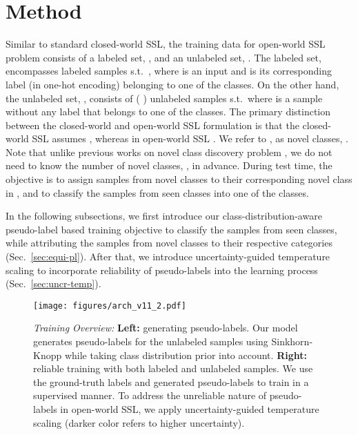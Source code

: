 \documentclass[runningheads]{eccv2022submission}
\begin{document}
  
\vspace{-2mm}
\section{Method}
\vspace{-2mm}

Similar to standard closed-world SSL, the training data for open-world SSL problem consists of a labeled set, , and an unlabeled set, . The labeled set,  encompasses  labeled samples s.t.\ , where  is an input and  is its corresponding label (in one-hot encoding) belonging to one of the  classes. On the other hand, the unlabeled set, , consists of  ( ) unlabeled samples s.t.\  where  is a sample without any label that belongs to one of the  classes. The primary distinction between the closed-world and open-world SSL formulation is that the closed-world SSL assumes , whereas in open-world SSL . We refer to , as novel classes, . Note that unlike previous works on novel class discovery problem \cite{Han2020Automatically,fini2021unified,Zhong_2021_CVPR}, we do not need to know the number of novel classes, , in advance. During test time, the objective is to assign samples from novel classes to their corresponding novel class in , and to classify the samples from seen classes into one of the  classes.

In the following subsections, we first introduce our class-distribution-aware pseudo-label based training objective to classify the samples from seen classes, while attributing the samples from novel classes to their respective categories (Sec.~\ref{sec:equi-pl}). After that, we introduce uncertainty-guided temperature scaling to incorporate reliability of pseudo-labels into the learning process (Sec.~\ref{sec:uncr-temp}). 



\begin{figure*}[h]
\vspace{2mm}
\begin{center}
  \texttt{[image: figures/arch\_v11\_2.pdf]}
\end{center}
\vspace{-4mm}
\caption{\textit{Training Overview:} \textbf{Left:} generating pseudo-labels. Our model generates pseudo-labels for the unlabeled samples using Sinkhorn-Knopp while taking class distribution prior into account. \textbf{Right:} reliable training with both labeled and unlabeled samples. We use the ground-truth labels and generated pseudo-labels to train in a supervised manner. To address the unreliable nature of pseudo-labels in open-world SSL, we apply uncertainty-guided temperature scaling (darker color refers to higher uncertainty).}
\vspace{-6mm}

\label{fig:arch}
\end{figure*}
\end{document}
